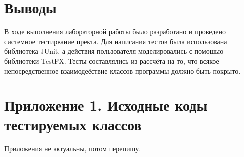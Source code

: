 \documentclass[a4paper,12pt]{article}
\begin{document}
\newpage\section*{Выводы}
В ходе выполнения лабораторной работы было разработано и проведено системное тестирвание пректа. Для написания тестов была использована библиотека JUnit, а действия пользователя моделировались с помошью библиотеки TestFX. Тесты составлялись из рассчёта на то, что всякое непосредственное взаимодеёствие классов программы должно быть покрыто. 
\newpage\section*{Приложение 1. Исходные коды тестируемых классов}
Приложения не актуальны, потом перепишу.
\end{document}
